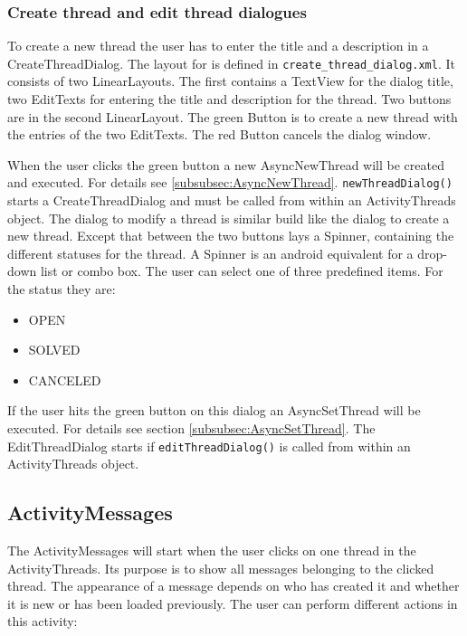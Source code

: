 \documentclass[12pt,a4paper,oneside]{report}
\newcommand{\code}[1]{\lstinline{#1}}
\begin{document}
\subsubsection{Create thread and edit thread dialogues}
To create a new thread the user has to enter the title and a description in a CreateThreadDialog. The layout for is defined in \code{create_thread_dialog.xml}. It consists of two LinearLayouts. The first contains a TextView for the dialog title, two EditTexts for entering the title and description for the thread. Two buttons are in the second LinearLayout. The green Button is to create a new thread with the entries of the two EditTexts. The red Button cancels the dialog window.

When the user clicks the green button a new AsyncNewThread will be created and executed. For details see \ref{subsubsec:AsyncNewThread}. \code{newThreadDialog()} starts a CreateThreadDialog and must be called from within an ActivityThreads object.
The dialog to modify a thread is similar build like the dialog to create a new thread. Except that between the two buttons lays a Spinner, containing the different statuses for the thread. A Spinner is an android equivalent for a drop-down list or combo box. The user can select one of three predefined items. For the status they are:
\begin{itemize}
\item OPEN
\item SOLVED
\item CANCELED
\end{itemize}


If the user hits the green button on this dialog an AsyncSetThread will be executed. For details see section \ref{subsubsec:AsyncSetThread}. The EditThreadDialog starts if \code{editThreadDialog()} is called from within an ActivityThreads object.

\subsection{ActivityMessages}
The ActivityMessages will start when the user clicks on one thread in the ActivityThreads. Its purpose is to show all messages belonging to the clicked thread. The appearance of a message depends on who has created it and whether it is new or has been loaded previously. The user can perform different actions in this activity:
\end{document}
